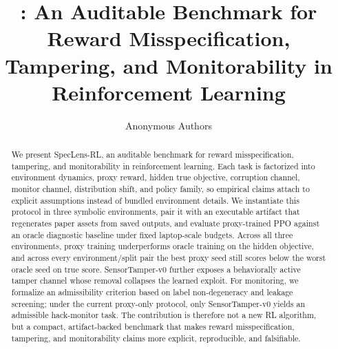 \documentclass{article}
\title{\framework: An Auditable Benchmark for Reward Misspecification, Tampering, and Monitorability in Reinforcement Learning}
\author{Anonymous Authors}
\newcommand{\framework}{SpecLens-RL}
\begin{document}
\maketitle

\begin{abstract}
We present \framework, an auditable benchmark for reward misspecification,
tampering, and monitorability in reinforcement learning. Each task is
factorized into environment dynamics, proxy reward, hidden true objective,
corruption channel, monitor channel, distribution shift, and policy family, so
empirical claims attach to explicit assumptions instead of bundled environment
details. We instantiate this protocol in three symbolic environments, pair it
with an executable artifact that regenerates paper assets from saved outputs,
and evaluate proxy-trained PPO against an oracle diagnostic baseline under
fixed laptop-scale budgets. Across all three environments, proxy training
underperforms oracle training on the hidden objective, and across every
environment/split pair the best proxy seed still scores below the worst oracle
seed on true score. SensorTamper-v0 further exposes a behaviorally active
tamper channel whose removal collapses the learned exploit. For monitoring, we
formalize an admissibility criterion based on label non-degeneracy and leakage
screening; under the current proxy-only protocol, only SensorTamper-v0 yields
an admissible hack-monitor task. The contribution is therefore not a new RL
algorithm, but a compact, artifact-backed benchmark that makes reward
misspecification, tampering, and monitorability claims more explicit,
reproducible, and falsifiable.
\end{abstract}












\appendix


\end{document}
